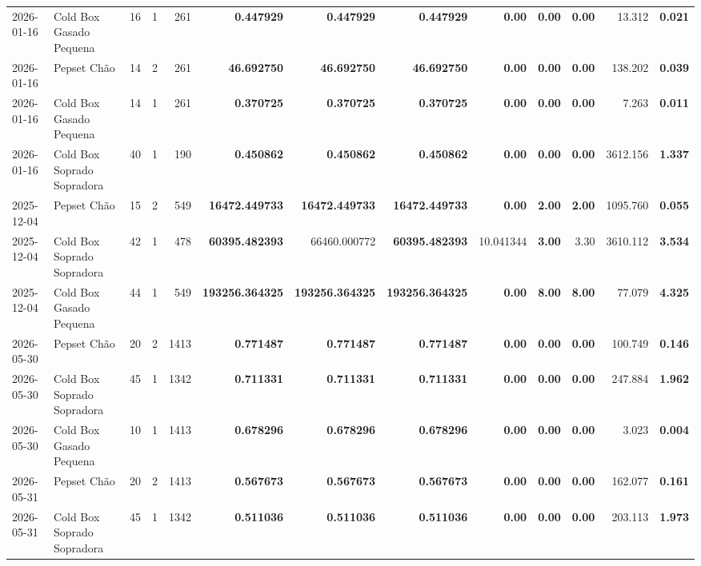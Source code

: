 {\begin{center}
{\begin{tabular}{@{}llrrrrrrrrrrr@{}}
2026-01-16 & Cold Box Gasado Pequena & 16 & 1 & 261 & \textbf{0.447929} & \textbf{0.447929} & \textbf{0.447929} & \textbf{0.00} & \textbf{0.00} & \textbf{0.00} & 13.312 & \textbf{0.021} \\
2026-01-16 & Pepset Chão & 14 & 2 & 261 & \textbf{46.692750} & \textbf{46.692750} & \textbf{46.692750} & \textbf{0.00} & \textbf{0.00} & \textbf{0.00} & 138.202 & \textbf{0.039} \\
2026-01-16 & Cold Box Gasado Pequena & 14 & 1 & 261 & \textbf{0.370725} & \textbf{0.370725} & \textbf{0.370725} & \textbf{0.00} & \textbf{0.00} & \textbf{0.00} & 7.263 & \textbf{0.011} \\
2026-01-16 & Cold Box Soprado Sopradora & 40 & 1 & 190 & \textbf{0.450862} & \textbf{0.450862} & \textbf{0.450862} & \textbf{0.00} & \textbf{0.00} & \textbf{0.00} & 3612.156 & \textbf{1.337} \\
2025-12-04 & Pepset Chão & 15 & 2 & 549 & \textbf{16472.449733} & \textbf{16472.449733} & \textbf{16472.449733} & \textbf{0.00} & \textbf{2.00} & \textbf{2.00} & 1095.760 & \textbf{0.055} \\
2025-12-04 & Cold Box Soprado Sopradora & 42 & 1 & 478 & \textbf{60395.482393} & 66460.000772 & \textbf{60395.482393} & 10.041344 & \textbf{3.00} & 3.30 & 3610.112 & \textbf{3.534} \\
2025-12-04 & Cold Box Gasado Pequena & 44 & 1 & 549 & \textbf{193256.364325} & \textbf{193256.364325} & \textbf{193256.364325} & \textbf{0.00} & \textbf{8.00} & \textbf{8.00} & 77.079 & \textbf{4.325} \\
2026-05-30 & Pepset Chão & 20 & 2 & 1413 & \textbf{0.771487} & \textbf{0.771487} & \textbf{0.771487} & \textbf{0.00} & \textbf{0.00} & \textbf{0.00} & 100.749 & \textbf{0.146} \\
2026-05-30 & Cold Box Soprado Sopradora & 45 & 1 & 1342 & \textbf{0.711331} & \textbf{0.711331} & \textbf{0.711331} & \textbf{0.00} & \textbf{0.00} & \textbf{0.00} & 247.884 & \textbf{1.962} \\
2026-05-30 & Cold Box Gasado Pequena & 10 & 1 & 1413 & \textbf{0.678296} & \textbf{0.678296} & \textbf{0.678296} & \textbf{0.00} & \textbf{0.00} & \textbf{0.00} & 3.023 & \textbf{0.004} \\
2026-05-31 & Pepset Chão & 20 & 2 & 1413 & \textbf{0.567673} & \textbf{0.567673} & \textbf{0.567673} & \textbf{0.00} & \textbf{0.00} & \textbf{0.00} & 162.077 & \textbf{0.161} \\
2026-05-31 & Cold Box Soprado Sopradora & 45 & 1 & 1342 & \textbf{0.511036} & \textbf{0.511036} & \textbf{0.511036} & \textbf{0.00} & \textbf{0.00} & \textbf{0.00} & 203.113 & \textbf{1.973} \\

\end{tabular}}
\end{center}}
